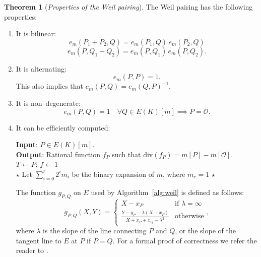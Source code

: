 \documentclass[9pt]{article}
\theoremstyle{definition}
\newtheorem{theorem}{Theorem}[section]
\begin{document}
\begin{theorem}[\textit{Properties of the Weil pairing}]
The Weil pairing has the following properties:
\begin{enumerate}[label=(\alph*)]
    \item It is bilinear: 
        $$e_m(P_1 + P_2, Q) = e_m(P_1, Q) \, e_m(P_2, Q)$$
        $$e_m(P, Q_1 + Q_2) = e_m(P, Q_1) \, e_m(P, Q_2).$$
    \item It is alternating:
        $$e_m(P, P) = 1.$$
        This also implies that $e_m(P, Q) = e_m(Q, P)^{-1}$.
    \item It is non--degenerate:
        $$e_m(P, Q) = 1 \quad \forall Q \in E(K)[m] \implies P = \mathcal{O}.$$
    \item It can be efficiently computed:
    
        \begin{algorithm}[H]
        	\SetAlgoLined
        	\textbf{Input}: $P \in E(K)[m]$. \\
        	\textbf{Output}: Rational function $f_P$ such that $\text{div}(f_P) = m[P] - m[\mathcal{O}]$. \\ 
        	$T \gets P$; $f \gets 1$ \\
        	$\star$ Let $\sum_{i = 0}^{r} 2^i m_i$ be the binary expansion of $m$, where $m_{r} = 1$ $\star$\\
        	\vspace{.3}
        	\caption{Efficient computation of $f_P$ for the Weil pairing}
        	\label{alg:weil}
        \end{algorithm}
        
        The function $g_{P,Q}$ on $E$ used by Algorithm~\ref{alg:weil} is defined as follows:
            $$g_{P,Q}(X, Y) = \begin{cases} X - x_P & \text{if } \lambda = \infty\\\displaystyle\frac{Y - y_P - \lambda (X - x_P)}{X + x_P + x_Q - \lambda^2} & \text{otherwise}\end{cases},$$
        where $\lambda$ is the slope of the line connecting $P$ and $Q$, or the slope of the tangent line to $E$ at $P$ if $P = Q$. For a formal proof of correctness we refer the reader to \cite[Theorem~5.41]{JH08}.
\end{enumerate}
\end{theorem}
\end{document}
